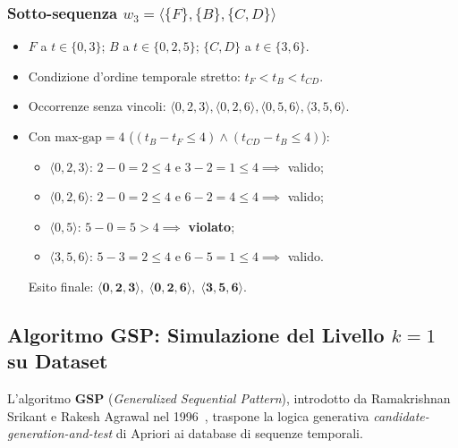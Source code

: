 \FloatBarrier
\subsubsection{Sotto-sequenza \texorpdfstring{$w_3 = \langle \{F\}, \{B\}, \{C, D\} \rangle$}{w3}}
\begin{itemize}
    \item $F$ a $t \in \{0, 3\}$; $B$ a $t \in \{0, 2, 5\}$; $\{C, D\}$ a $t \in \{3, 6\}$.
    \item Condizione d'ordine temporale stretto: $t_F < t_B < t_{CD}$.
    \item Occorrenze senza vincoli: $\langle 0, 2, 3 \rangle, \langle 0, 2, 6 \rangle, \langle 0, 5, 6 \rangle, \langle 3, 5, 6 \rangle$.
    \item Con $\text{max-gap} = 4$ ($(t_B - t_F \le 4) \land (t_{CD} - t_B \le 4)$):
    \begin{itemize}
        \item $\langle 0, 2, 3 \rangle$: $2 - 0 = 2 \le 4$ e $3 - 2 = 1 \le 4 \implies$ valido;
        \item $\langle 0, 2, 6 \rangle$: $2 - 0 = 2 \le 4$ e $6 - 2 = 4 \le 4 \implies$ valido;
        \item $\langle 0, 5 \rangle$: $5 - 0 = 5 > 4 \implies$ \textbf{violato};
        \item $\langle 3, 5, 6 \rangle$: $5 - 3 = 2 \le 4$ e $6 - 5 = 1 \le 4 \implies$ valido.
    \end{itemize}
    Esito finale: $\mathbf{\langle 0, 2, 3 \rangle, \; \langle 0, 2, 6 \rangle, \; \langle 3, 5, 6 \rangle}$.
\end{itemize}

\FloatBarrier
\subsection{Algoritmo GSP: Simulazione del Livello \texorpdfstring{$k=1$}{k=1} su Dataset}
\label{sec:dm-gsp-simulation-l1}

L'algoritmo \textbf{GSP} (\textit{Generalized Sequential Pattern}), introdotto da Ramakrishnan Srikant e Rakesh Agrawal nel 1996~\cite{srikant1996}, traspone la logica generativa \textit{candidate-generation-and-test} di Apriori ai database di sequenze temporali.

